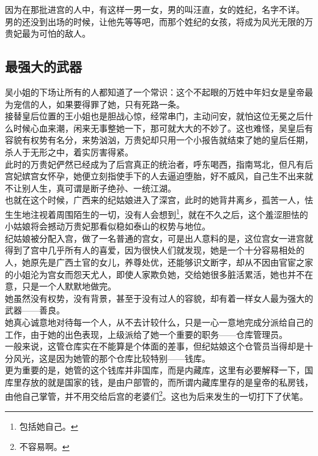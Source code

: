 \begin{multicols}{\theparacolNo}
因为在那批进宫的人中，有这样一男一女，男的叫汪直，女的姓纪，名字不详。\\

男的还没到出场的时候，让他先等等吧，而那个姓纪的女孩，将成为风光无限的万贵妃最为可怕的敌人。\\

\subsection{最强大的武器}
吴小姐的下场让所有的人都知道了一个常识：这个不起眼的万姓中年妇女是皇帝最为宠信的人，如果要得罪了她，只有死路一条。\\

接替皇后位置的王小姐也是胆战心惊，经常串门，主动问安，就怕这位无冕之后什么时候心血来潮，闲来无事整她一下，那可就大大的不妙了。这也难怪，吴皇后有容貌有权势有名分，来势汹汹，万贵妃却只用一个小报告就结束了她的皇后任期，杀人于无形之中，着实厉害得紧。\\

此时的万贵妃俨然已经成为了后宫真正的统治者，呼东喝西，指南骂北，但凡有后宫妃嫔宫女怀孕，她便立刻指使手下的人去逼迫堕胎，好不威风，自己生不出来就不让别人生，真可谓是断子绝孙、一统江湖。\\

也就在这个时候，广西来的纪姑娘进入了深宫，此时的她背井离乡，孤苦一人，怯生生地注视着周围陌生的一切，没有人会想到\footnote{包括她自己。}，就在不久之后，这个羞涩胆怯的小姑娘将会撼动万贵妃那看似稳如泰山的权势与地位。\\

纪姑娘被分配入宫，做了一名普通的宫女，可是出人意料的是，这位宫女一进宫就得到了宫中几乎所有人的喜爱，因为很快人们就发现，她是一个十分容易相处的人，她原先是广西土官的女儿，养尊处优，还能够识文断字，却从不因由官宦之家的小姐沦为宫女而怨天尤人，即使人家欺负她，交给她很多脏活累活，她也并不在意，只是一个人默默地做完。\\

她虽然没有权势，没有背景，甚至于没有过人的容貌，却有着一样女人最为强大的武器——善良。\\

她真心诚意地对待每一个人，从不去计较什么，只是一心一意地完成分派给自己的工作，由于她的出色表现，上级派给了她一个重要的职务——仓库管理员。\\

一般来说，这管仓库实在不能算是个体面的差事，但纪姑娘这个仓管员当得却是十分风光，这是因为她管的那个仓库比较特别——钱库。\\

更为重要的是，她管的这个钱库并非国库，而是内藏库，这里有必要解释一下，国库里存放的就是国家的钱，是由户部管的，而所谓内藏库里存的是皇帝的私房钱，由他自己掌管，并不用交给后宫的老婆们\footnote{不容易啊。}。这也为后来发生的一切打下了伏笔。\\


\end{multicols}
